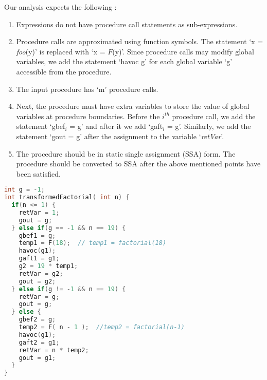 \documentclass{llncs}
\newcommand{\foo}{\textit{foo}}
\newcommand{\retVar}{\textit{retVar}}
\newcommand{\F}{\mathit{F}}
\begin{document}
Our analysis expects the following :
\begin{enumerate}
\item Expressions do not have procedure call statements as
  sub-expressions. 
\item Procedure calls are approximated using function symbols. The
  statement `x = \foo(y)' is replaced with `x = $\F$(y)'. Since
  procedure calls may modify global variables, we add the statement
  `havoc g' for each global variable `g' accessible from the
  procedure.
\item The input procedure has `m' procedure calls.
\item Next, the procedure must have extra variables to store the value
  of global variables at procedure boundaries.  Before the
  $\mathit{i^{th}}$ procedure call, we add the statement `gbef$_i$ =
  g' and after it we add `gaft$_i$ = g'. Similarly, we add the
  statement `gout = g' after the assignment to the variable `\retVar'.
\item The procedure should be in static single assignment (SSA)
  form. The procedure should be converted to SSA after the above
  mentioned points have been satisfied.
\end{enumerate}

\begin{lstlisting}[language=c, caption= {Procedure `factorial' from
      Listing~\ref{lst:factorialSimple} converted to the form our
      approach expects. We refer to this procedure as `transformed
      factorial'.}, label=lst:factorialTransformed]
int g = -1;
int transformedFactorial( int n) {
  if(n <= 1) {
    retVar = 1;
    gout = g;
  } else if(g == -1 && n == 19) {
    gbef1 = g;
    temp1 = F(18);  // temp1 = factorial(18)
    havoc(g1);
    gaft1 = g1;
    g2 = 19 * temp1;
    retVar = g2;
    gout = g2;
  } else if(g != -1 && n == 19) {
    retVar = g;
    gout = g;
  } else {
    gbef2 = g;
    temp2 = F( n - 1 );  //temp2 = factorial(n-1)
    havoc(g1);    
    gaft2 = g1;
    retVar = n * temp2;
    gout = g1;
  }
}
\end{lstlisting}

\end{document}
